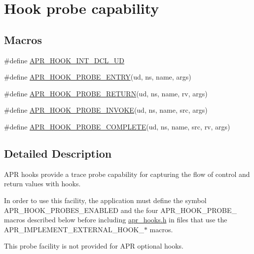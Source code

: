 \hypertarget{group__apr__hook__probes}{\section{Hook probe capability}
\label{group__apr__hook__probes}
}
\subsection*{Macros}
\begin{DoxyCompactItemize}
\item 
\#define \hyperlink{group__apr__hook__probes_ga258d03fb4cf228fcb9d2fa094625ffaf}{A\-P\-R\-\_\-\-H\-O\-O\-K\-\_\-\-I\-N\-T\-\_\-\-D\-C\-L\-\_\-\-U\-D}
\item 
\#define \hyperlink{group__apr__hook__probes_ga320422eebccc41f9329e34e11939e302}{A\-P\-R\-\_\-\-H\-O\-O\-K\-\_\-\-P\-R\-O\-B\-E\-\_\-\-E\-N\-T\-R\-Y}(ud, ns, name, args)
\item 
\#define \hyperlink{group__apr__hook__probes_gab3017efe0bb66b97b6b7931245211692}{A\-P\-R\-\_\-\-H\-O\-O\-K\-\_\-\-P\-R\-O\-B\-E\-\_\-\-R\-E\-T\-U\-R\-N}(ud, ns, name, rv, args)
\item 
\#define \hyperlink{group__apr__hook__probes_ga030df3d86fe087857b32388e01ad3928}{A\-P\-R\-\_\-\-H\-O\-O\-K\-\_\-\-P\-R\-O\-B\-E\-\_\-\-I\-N\-V\-O\-K\-E}(ud, ns, name, src, args)
\item 
\#define \hyperlink{group__apr__hook__probes_ga5793578cb2da7815b20b9a87c281ed7c}{A\-P\-R\-\_\-\-H\-O\-O\-K\-\_\-\-P\-R\-O\-B\-E\-\_\-\-C\-O\-M\-P\-L\-E\-T\-E}(ud, ns, name, src, rv, args)
\end{DoxyCompactItemize}


\subsection{Detailed Description}
A\-P\-R hooks provide a trace probe capability for capturing the flow of control and return values with hooks.

In order to use this facility, the application must define the symbol A\-P\-R\-\_\-\-H\-O\-O\-K\-\_\-\-P\-R\-O\-B\-E\-S\-\_\-\-E\-N\-A\-B\-L\-E\-D and the four A\-P\-R\-\_\-\-H\-O\-O\-K\-\_\-\-P\-R\-O\-B\-E\-\_\- macros described below before including \hyperlink{apr__hooks_8h}{apr\-\_\-hooks.\-h} in files that use the A\-P\-R\-\_\-\-I\-M\-P\-L\-E\-M\-E\-N\-T\-\_\-\-E\-X\-T\-E\-R\-N\-A\-L\-\_\-\-H\-O\-O\-K\-\_\-$\ast$ macros.

This probe facility is not provided for A\-P\-R optional hooks. 

